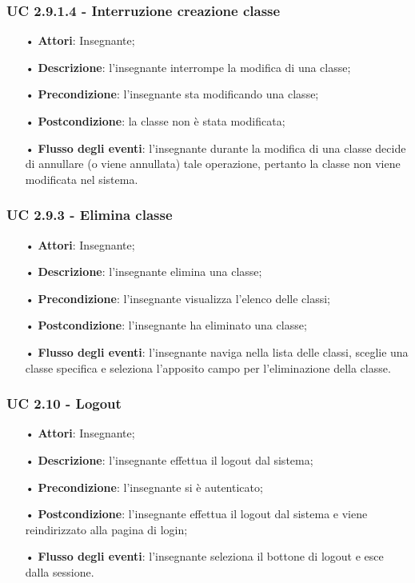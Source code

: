 \subsubsection{UC 2.9.1.4 - Interruzione creazione classe}
\begin{itemize}
	\item[•] \textbf{Attori}: Insegnante;
	\item[•] \textbf{Descrizione}: l'insegnante interrompe la modifica di una classe;
	\item[•] \textbf{Precondizione}: l'insegnante sta modificando una classe;
	\item[•] \textbf{Postcondizione}: la classe non è stata modificata;
	\item[•] \textbf{Flusso degli eventi}: l'insegnante durante la modifica di una classe decide di annullare (o viene annullata) tale operazione, pertanto la classe non viene modificata nel sistema.
\end{itemize}


\subsubsection{UC 2.9.3 - Elimina classe}
\begin{itemize}
	\item[•] \textbf{Attori}: Insegnante;
	\item[•] \textbf{Descrizione}: l'insegnante elimina una classe;
	\item[•] \textbf{Precondizione}: l'insegnante visualizza l'elenco delle classi;
	\item[•] \textbf{Postcondizione}: l'insegnante ha eliminato una classe;
	\item[•] \textbf{Flusso degli eventi}:  l'insegnante naviga nella lista delle classi, sceglie una classe specifica e seleziona l'apposito campo per l'eliminazione della classe.
\end{itemize}

\subsubsection{UC 2.10 - Logout}
\begin{itemize}
	\item[•] \textbf{Attori}: Insegnante;
	\item[•] \textbf{Descrizione}:  l'insegnante effettua il logout dal sistema;
	\item[•] \textbf{Precondizione}: l'insegnante si è autenticato;
	\item[•] \textbf{Postcondizione}: l’insegnante effettua il logout dal sistema e viene reindirizzato alla pagina di login;
	\item[•] \textbf{Flusso degli eventi}: l’insegnante seleziona il bottone di logout e esce dalla sessione.
\end{itemize}

